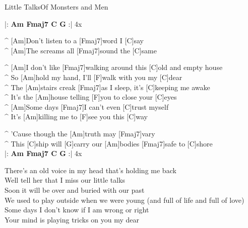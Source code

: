 \begin{song}{Little Talks}{Of Monsters and Men}

\begin{guitar}
|: \textbf{ Am   Fmaj7   C   G} :| 4x\\
\end{guitar}


\begin{guitar}
^ [Am]Don't listen to a [Fmaj7]word I [C]say\\
^ [Am]The screams all [Fmaj7]sound the [C]same\\
\end{guitar}

\begin{guitar}
^ [Am]I don't like [Fmaj7]walking around this [C]old and empty house\\
^ So [Am]hold my hand, I'll [F]walk with you my [C]dear\\
^ The [Am]stairs creak [Fmaj7]as I sleep, it's [C]keeping me awake\\
^ It's the [Am]house telling [F]you to close your [C]eyes\\
^ [Am]Some days [Fmaj7]I can't even  [C]trust myself\\
^ It's [Am]killing me to [F]see you this [C]way\\
\end{guitar}


\begin{guitar}
^ 'Cause though the [Am]truth may [Fmaj7]vary\\
^ This [C]ship will [G]carry our [Am]bodies [Fmaj7]safe to [C]shore \\
|: \textbf{ Am   Fmaj7   C   G} :| 4x\\
\end{guitar}


\begin{guitar}
There's an old voice in my head that's holding me back\\
Well tell her that I miss our little talks\\
Soon it will be over and buried with our past\\
We used to play outside when we were young (and full of life and full of love)\\
Some days I don't know if I am wrong or right\\
Your mind is playing tricks on you my dear\\
\end{guitar}


\end{song}
